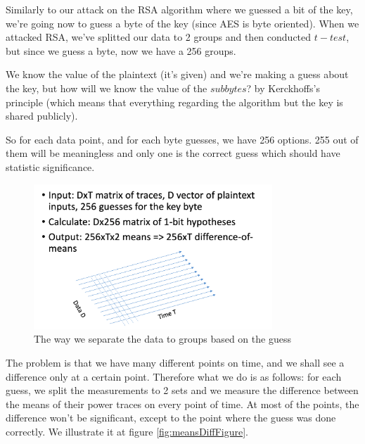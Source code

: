 Similarly to our attack on the RSA algorithm where we guessed a bit of the key, we're going now to guess a byte of the key (since AES is byte oriented). When we attacked RSA, we've splitted our data to 2 groups and then conducted $t-test$, but since we guess a byte, now we have a 256 groups. 

We know the value of the plaintext (it's given) and we're making a guess about the key, but how will we know the value of the $subbytes$? by Kerckhoffs's principle (which means that everything regarding the algorithm but the key is shared publicly).

So for each data point, and for each byte guesses, we have 256 options. 255 out of them will be meaningless and only one is the correct guess which should have statistic significance.

\begin{figure}[H]
\centering
\includegraphics[width=0.8\textwidth]{images/Lecture6/dpa-separation-figure.png}
\caption{The way we separate the data to groups based on the guess}
\label{fig:dpa-separation-figure}
\end{figure}

The problem is that we have many different points on time, and we shall see a difference only at a certain point. Therefore what we do is as follows: for each guess, we split the measurements to 2 sets and we measure the difference between the means of their power traces on every point of time. At most of the points, the difference won't be significant, except to the point where the guess was done correctly. We illustrate it at figure \ref{fig:meansDiffFigure}.


